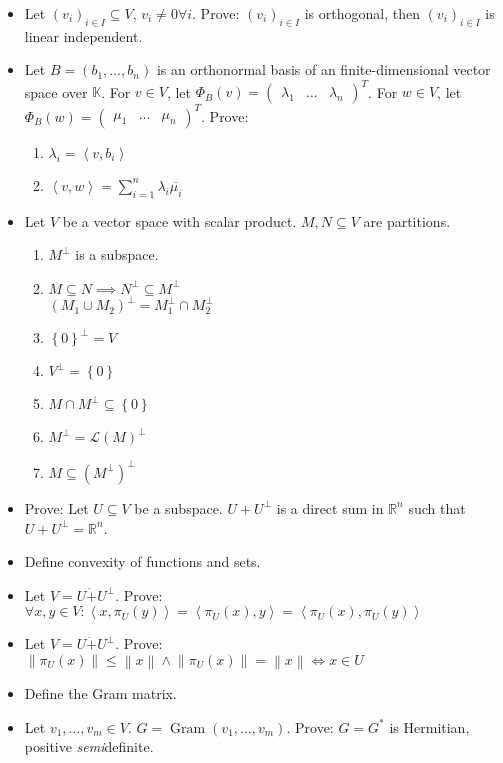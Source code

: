 \documentclass[a4paper]{article}
\newcommand{\set}[1]{\left\{#1\right\}}
\newcommand{\ip}[2]{\left\langle#1,#2\right\rangle} %
\newcommand{\norm}[1]{\left\|#1\right\|}
\begin{document}
\begin{itemize}
  \item Let $(v_i)_{i \in I} \subseteq V$, $v_i \neq 0 \forall i$. Prove: $(v_i)_{i \in I}$ is orthogonal, then $(v_i)_{i \in I}$ is linear independent.
  \item Let $B = (b_1, \ldots, b_n)$ is an orthonormal basis of an finite-dimensional vector space over $\mathbb K$.
    For $v \in V$, let $\Phi_B(v) = \begin{pmatrix} \lambda_1 & \dots & \lambda_n \end{pmatrix}^T$.
    For $w \in V$, let $\Phi_B(w) = \begin{pmatrix} \mu_1 & \dots & \mu_n \end{pmatrix}^T$. Prove:
    \begin{enumerate}
      \item $\lambda_i = \ip{v}{b_i}$
      \item $\ip vw = \sum_{i=1}^n \lambda_i \overline{\mu_i}$
    \end{enumerate}
  \item Let $V$ be a vector space with scalar product. $M, N \subseteq V$ are partitions.
    \begin{enumerate}
      \item $M^\bot$ is a subspace.
      \item $M \subseteq N \implies N^\bot \subseteq M^\bot$ \\
        $(M_1 \cup M_2)^\bot = M_1^\bot \cap M_2^\bot$
      \item $\set{0}^\bot = V$
      \item $V^\bot = \set{0}$
      \item $M \cap M^\bot \subseteq \set{0}$
      \item $M^\bot = \mathcal L(M)^\bot$
      \item $M \subseteq (M^\bot)^\bot$
    \end{enumerate}
  \item Prove: Let $U \subseteq V$ be a subspace. $U + U^\bot$ is a direct sum in $\mathbb R^n$ such that $U + U^\bot = \mathbb R^n$.
  \item Define convexity of functions and sets.
  \item Let $V = U \dot+ U^{\bot}$. Prove: $\forall x, y \in V: \ip{x}{\pi_{U}(y)} = \ip{\pi_U(x)}{y} = \ip{\pi_U(x)}{\pi_U(y)}$
  \item Let $V = U \dot+ U^{\bot}$. Prove: $\norm{\pi_U(x)} \leq \norm{x} \land \norm{\pi_U(x)} = \norm{x} \iff x \in U$
  \item Define the Gram matrix.
  \item Let $v_1, \ldots, v_m \in V$. $G = \operatorname{Gram}(v_1, \ldots, v_m)$. Prove: $G = G^*$ is Hermitian, positive \emph{semi}definite.

\end{itemize}
\end{document}
